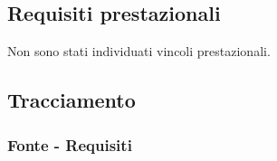 
\subsection{Requisiti prestazionali}
Non sono stati individuati vincoli prestazionali.

\subsection{Tracciamento}
\subsubsection{Fonte - Requisiti}

